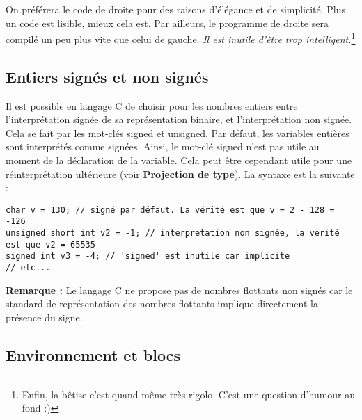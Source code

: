 \documentclass[../../../main.tex]{subfiles}
\begin{document}
On préférera le code de droite pour des raisons d'élégance et de simplicité. Plus un code est lisible, mieux cela est. Par ailleurs, le programme de droite sera compilé un peu plus vite que celui de gauche. \textit{Il est inutile d'être trop intelligent.}\footnote{Enfin, la bêtise c'est quand même très rigolo. C'est une question d'humour au fond :)}
\subsection{Entiers signés et non signés}
Il est possible en langage C de choisir pour les nombres entiers entre l'interprétation signée de sa représentation binaire, et l'interprétation non signée. Cela se fait par les mot-clés \textsf{signed} et \textsf{unsigned}. Par défaut, les variables entières sont interprétés comme signées. Ainsi, le mot-clé \textsf{signed} n'est pas utile au moment de la déclaration de la variable. Cela peut être cependant utile pour une réinterprétation ultérieure (voir \textbf{Projection de type}). La syntaxe est la suivante :
\begin{verbatim}
char v = 130; // signé par défaut. La vérité est que v = 2 - 128 = -126
unsigned short int v2 = -1; // interpretation non signée, la vérité est que v2 = 65535
signed int v3 = -4; // 'signed' est inutile car implicite
// etc...
\end{verbatim}
\textbf{Remarque :} Le langage C ne propose pas de nombres flottants non signés car le standard de représentation des nombres flottants implique directement la présence du signe.

\subsection{Environnement et blocs}

\end{document}
